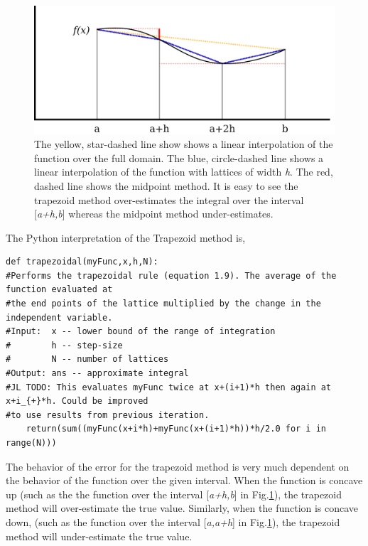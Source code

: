 \documentclass[10pt]{article}
\begin{document}
\begin{figure}[!ht]
    \begin{center}
	\includegraphics[width=\columnwidth]{interpolation.png}
	\caption{The yellow, star-dashed line show shows a linear interpolation of the function over the full domain. The blue, circle-dashed line shows a linear interpolation of the function with lattices of width \textit{h}. The red, dashed line shows the midpoint method. It is easy to see the trapezoid method over-estimates the integral over the interval [\textit{a+h,b}] whereas the midpoint method under-estimates.}
	\label{fig:interpolation}
	\end{center}
\end{figure}

The Python interpretation of the Trapezoid method is,
\begin{lstlisting}
def trapezoidal(myFunc,x,h,N):
#Performs the trapezoidal rule (equation 1.9). The average of the function evaluated at
#the end points of the lattice multiplied by the change in the independent variable.
#Input:  x -- lower bound of the range of integration
#        h -- step-size
#        N -- number of lattices
#Output: ans -- approximate integral
#JL TODO: This evaluates myFunc twice at x+(i+1)*h then again at x+i_{+}*h. Could be improved
#to use results from previous iteration.
    return(sum((myFunc(x+i*h)+myFunc(x+(i+1)*h))*h/2.0 for i in range(N)))
\end{lstlisting}

The behavior of the error for the trapezoid method is very much dependent on the behavior of the function over the given interval. When the function is concave up (such as the the function over the interval [\textit{a+h,b}] in Fig.\ref{fig:interpolation}), the trapezoid method will over-estimate the true value. Similarly, when the function is concave down, (such as the function over the interval [\textit{a,a+h}] in Fig.\ref{fig:interpolation}), the trapezoid method will under-estimate the true value.
\end{document}
